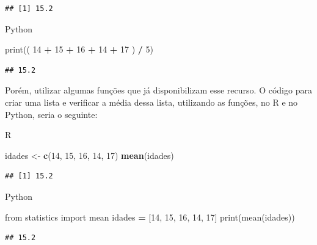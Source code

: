 \documentclass[
]{book}
\newenvironment{Shaded}{\begin{snugshade}}{\end{snugshade}}
\newcommand{\BuiltInTok}[1]{#1}
\newcommand{\DecValTok}[1]{\textcolor[rgb]{0.00,0.00,0.81}{#1}}
\newcommand{\FunctionTok}[1]{\textcolor[rgb]{0.13,0.29,0.53}{\textbf{#1}}}
\newcommand{\ImportTok}[1]{#1}
\newcommand{\NormalTok}[1]{#1}
\newcommand{\OperatorTok}[1]{\textcolor[rgb]{0.81,0.36,0.00}{\textbf{#1}}}
\newcommand{\OtherTok}[1]{\textcolor[rgb]{0.56,0.35,0.01}{#1}}
\begin{document}
\begin{verbatim}
## [1] 15.2
\end{verbatim}

Python

\begin{Shaded}
\begin{Highlighting}[]
\BuiltInTok{print}\NormalTok{(( }\DecValTok{14} \OperatorTok{+} \DecValTok{15} \OperatorTok{+} \DecValTok{16} \OperatorTok{+} \DecValTok{14} \OperatorTok{+} \DecValTok{17}\NormalTok{ ) }\OperatorTok{/} \DecValTok{5}\NormalTok{)}
\end{Highlighting}
\end{Shaded}

\begin{verbatim}
## 15.2
\end{verbatim}

Porém, utilizar algumas funções que já disponibilizam esse recurso. O código para criar uma lista e verificar a média dessa lista, utilizando as funções, no R e no Python, seria o seguinte:

R

\begin{Shaded}
\begin{Highlighting}[]
\NormalTok{idades }\OtherTok{\textless{}{-}} \FunctionTok{c}\NormalTok{(}\DecValTok{14}\NormalTok{, }\DecValTok{15}\NormalTok{, }\DecValTok{16}\NormalTok{, }\DecValTok{14}\NormalTok{, }\DecValTok{17}\NormalTok{)}
\FunctionTok{mean}\NormalTok{(idades)}
\end{Highlighting}
\end{Shaded}

\begin{verbatim}
## [1] 15.2
\end{verbatim}

Python

\begin{Shaded}
\begin{Highlighting}[]
\ImportTok{from}\NormalTok{ statistics }\ImportTok{import}\NormalTok{ mean }
\NormalTok{idades }\OperatorTok{=}\NormalTok{ [}\DecValTok{14}\NormalTok{, }\DecValTok{15}\NormalTok{, }\DecValTok{16}\NormalTok{, }\DecValTok{14}\NormalTok{, }\DecValTok{17}\NormalTok{]}
\BuiltInTok{print}\NormalTok{(mean(idades))}
\end{Highlighting}
\end{Shaded}

\begin{verbatim}
## 15.2
\end{verbatim}
\end{document}
